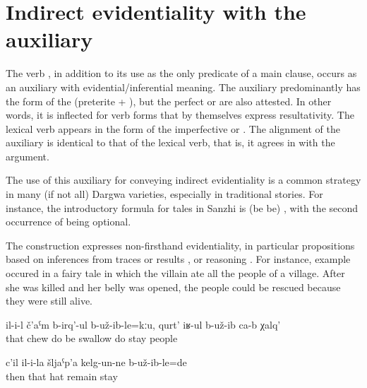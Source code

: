 
\section{Indirect evidentiality with the auxiliary \protect{} \protect{}}
\label{sec:Indirect evidentiality with the auxiliary b-uz be, be at, stay, remain}

The verb  , in addition to its use as the only predicate of a main clause, occurs as an auxiliary with evidential\slash inferential meaning. The auxiliary predominantly has the form of the  (preterite + ), but the perfect or  are also attested. In other words, it is inflected for verb forms that by themselves express resultativity. The lexical verb appears in the form of the imperfective or . The alignment of the auxiliary is identical to that of the lexical verb, that is, it agrees in  with the  argument.

The use of this auxiliary for conveying indirect evidentiality is a common strategy in many (if not all) Dargwa varieties, especially in traditional stories. For instance, the introductory formula for tales in Sanzhi is  (be  be) , with the second occurrence of  being optional.

The construction expresses non-firsthand evidentiality, in particular propositions based on inferences from traces or results ,  or reasoning . For instance, example  occured in a fairy tale in which the villain ate all the people of a village. After she was killed and her belly was opened, the people could be rescued because they were still alive.

\begin{exe}
	\ex	\label{ex:(It turned out that) she did not chew the people, but swallowed them@13}
	\gll	il-i-l	č'aˁm	b-irq'-ul	b-už-ib-le=kːu,	qurt' 	iʁ-ul	b-už-ib ca-b	χalq'\\
		that	chew	do	be	swallow	do	stay  people\\
	\glt	{}

	\ex	\label{ex:Then (apparently) his hat remained there@14}
	\gll	c'il	il-i-la	šljaˁp'a	kelg-un-ne	b-už-ib-le=de\\
		then	that	hat	remain	stay\\
	\glt	{}
\end{exe}

